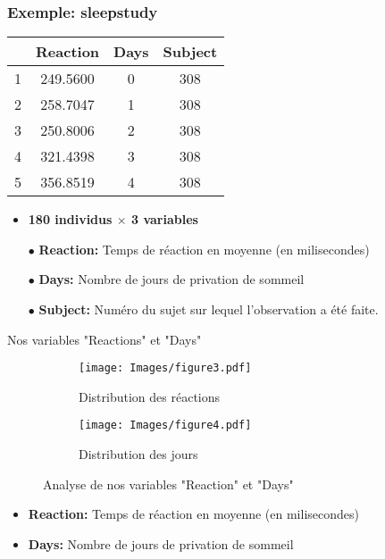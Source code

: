 \documentclass[unknownkeysallowed]{beamer}
\begin{document}
\begin{frame}
\frametitle{Exemple: sleepstudy}
\begin{center}
\begin{tabular}{ c c c c }
\hline
 & Reaction & Days & Subject \\
\hline
1 & 249.5600 & 0 & 308 \\
2 & 258.7047 & 1 & 308 \\
3 & 250.8006 & 2 & 308 \\
4 & 321.4398 & 3 & 308 \\
5 & 356.8519 & 4 & 308 \\
\hline
\end{tabular}
\end{center}
 \begin{itemize}
     \item \textbf{180 individus $\times$ 3 variables}
     \item[$\bullet$] \textbf{Reaction:} Temps de réaction en moyenne (en milisecondes)
    \item[$\bullet$] \textbf{Days:} Nombre de jours de privation de sommeil
    \item[$\bullet$] \textbf{Subject:} Numéro du sujet sur lequel l'observation a été faite.
 \end{itemize}

\end{frame}


\begin{frame}{Nos variables "Reactions" et "Days"}
    \begin{figure}[H]
\centering
\begin{subfigure}{.5\textwidth}
  \centering
  \texttt{[image: Images/figure3.pdf]}
  \caption{Distribution des réactions}
\end{subfigure}%
\begin{subfigure}{.5\textwidth}
  \centering
  \texttt{[image: Images/figure4.pdf]}
  \caption{Distribution des jours}
\end{subfigure}
\caption{Analyse de nos variables "Reaction" et "Days"}
\end{figure}
   \begin{itemize}
     \item \textbf{Reaction:} Temps de réaction en moyenne (en milisecondes)
    \item \textbf{Days:} Nombre de jours de privation de sommeil
 \end{itemize}
\end{frame}
\end{document}
